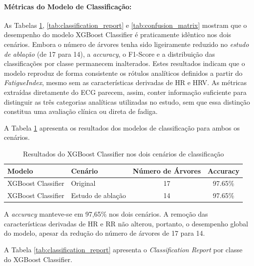 \paragraph{Métricas do Modelo de Classificação:}
\mbox{}\par
As Tabelas \ref{tab:accuracy_classifier}, \ref{tab:classification_report} e \ref{tab:confusion_matrix} mostram que o desempenho do modelo XGBoost Classifier é praticamente idêntico nos dois cenários. Embora o número de árvores tenha sido ligeiramente reduzido no \textit{estudo de ablação} (de 17 para 14), a \textit{accuracy}, o F1-Score e a distribuição das classificações por classe permanecem inalterados. Estes resultados indicam que o modelo reproduz de forma consistente os rótulos analíticos definidos a partir do \textit{FatigueIndex}, mesmo sem as características derivadas de HR e HRV. As métricas extraídas diretamente do ECG parecem, assim, conter informação suficiente para distinguir as três categorias analíticas utilizadas no estudo, sem que essa distinção constitua uma avaliação clínica ou direta de fadiga.

A Tabela \ref{tab:accuracy_classifier} apresenta os resultados dos modelos de classificação para ambos os cenários.

\par\medskip
\begin{table}[H]
\centering
\caption{Resultados do XGBoost Classifier nos dois cenários de classificação}
\label{tab:accuracy_classifier}
\small
\begin{tabular}{l l c c}
\hline
Modelo & Cenário & Número de Árvores & Accuracy \\
\hline
XGBoost Classifier & Original & 17 & 97.65\% \\
XGBoost Classifier & Estudo de ablação & 14 & 97.65\% \\
\hline
\end{tabular}
\end{table}

A \textit{accuracy} manteve-se em 97,65\% nos dois cenários. A remoção das características derivadas de HR e RR não alterou, portanto, o desempenho global do modelo, apesar da redução do número de árvores de 17 para 14.

A Tabela \ref{tab:classification_report} apresenta o \textit{Classification Report} por classe do XGBoost Classifier.

